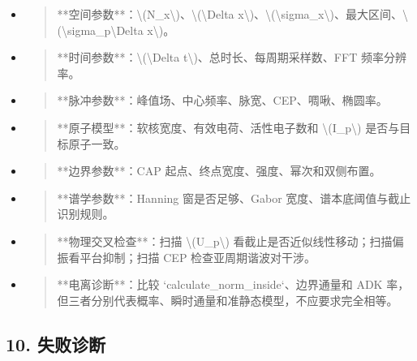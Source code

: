 \documentclass[UTF8,openany,11pt,fontset=fandol]{ctexbook}
\begin{document}
\begin{itemize}
\item
  \begin{quote}
  **空间参数**：\textbackslash(N\_x\textbackslash)、\textbackslash(\textbackslash Delta
  x\textbackslash)、\textbackslash(\textbackslash sigma\_x\textbackslash)、最大区间、\textbackslash(\textbackslash sigma\_p\textbackslash Delta
  x\textbackslash)。
  \end{quote}
\item
  \begin{quote}
  **时间参数**：\textbackslash(\textbackslash Delta
  t\textbackslash)、总时长、每周期采样数、FFT 频率分辨率。
  \end{quote}
\item
  \begin{quote}
  **脉冲参数**：峰值场、中心频率、脉宽、CEP、啁啾、椭圆率。
  \end{quote}
\item
  \begin{quote}
  **原子模型**：软核宽度、有效电荷、活性电子数和
  \textbackslash(I\_p\textbackslash) 是否与目标原子一致。
  \end{quote}
\item
  \begin{quote}
  **边界参数**：CAP 起点、终点宽度、强度、幂次和双侧布置。
  \end{quote}
\item
  \begin{quote}
  **谱学参数**：Hanning 窗是否足够、Gabor
  宽度、谱本底阈值与截止识别规则。
  \end{quote}
\item
  \begin{quote}
  **物理交叉检查**：扫描 \textbackslash(U\_p\textbackslash)
  看截止是否近似线性移动；扫描偏振看平台抑制；扫描 CEP
  检查亚周期谐波对干涉。
  \end{quote}
\item
  \begin{quote}
  **电离诊断**：比较 `calculate\_norm\_inside`、边界通量和 ADK
  率，但三者分别代表概率、瞬时通量和准静态模型，不应要求完全相等。
  \end{quote}
\end{itemize}

\subsection{\texorpdfstring{\textbf{10.
失败诊断}}{10. 失败诊断}}\label{ux5931ux8d25ux8bcaux65ad-1}
\end{document}
